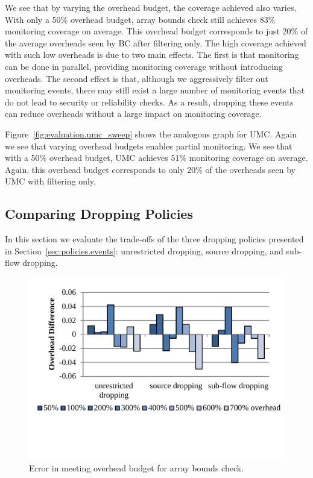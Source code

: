 We see that by varying the overhead budget, the coverage achieved also varies.
With only a 50\% overhead budget, array bounds check still
achieves 83\% monitoring coverage on average. This overhead budget corresponds
to just 20\% of the average overheads seen by BC after filtering only. The high coverage
achieved with such low overheads is due to two main effects.  The first is that
monitoring can be done in parallel, providing monitoring coverage without
introducing overheads. The second effect is that, although we aggressively
filter out monitoring events, there may still exist a large number of
monitoring events that do not lead to security or reliability checks. As a
result, dropping these events can reduce overheads without a large impact on
monitoring coverage.

Figure~\ref{fig:evaluation.umc_sweep} shows the analogous graph for UMC. Again
we see that varying overhead budgets enables partial monitoring. We see that
with a 50\% overhead budget, UMC achieves 51\% monitoring coverage on average.
Again, this overhead budget corresponds to only 20\% of the overheads seen by UMC
with filtering only.

\subsection{Comparing Dropping Policies}

In this section we evaluate the trade-offs of the three dropping policies
presented in Section~\ref{sec:policies.events}: unrestricted dropping, source
dropping, and sub-flow dropping.

\begin{figure}
  \begin{center}
    \includegraphics[width=\columnwidth]{figs/data_bc_exec_time.pdf}
    \vspace{-0.2in}
    \caption{Error in meeting overhead budget for array bounds check.}
    \label{fig:evaluation.bc_exec_time}
    \vspace{-0.2in}
  \end{center}
\end{figure}

